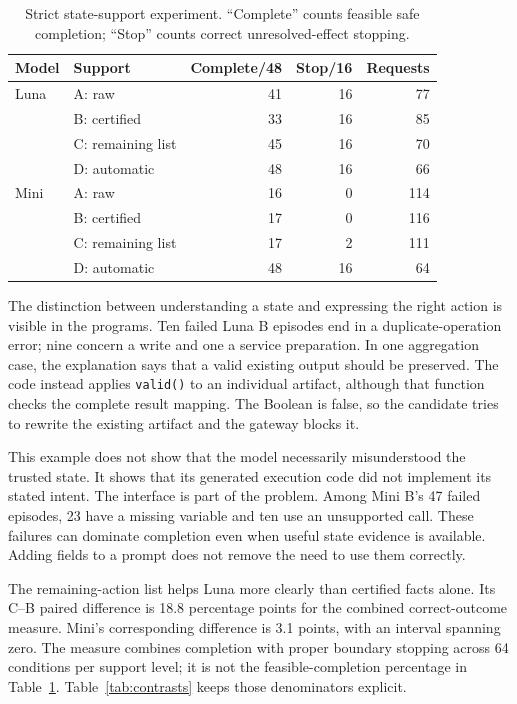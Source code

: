 \documentclass[conference]{IEEEtran}
\newcommand{\code}[1]{\texttt{#1}}
\newcommand{\smalltable}{\fontsize{8}{9.5}\selectfont}
\begin{document}
\begin{table}[t]
\centering\smalltable
\caption{Strict state-support experiment. ``Complete'' counts feasible safe completion; ``Stop'' counts correct unresolved-effect stopping.}
\label{tab:state}
\begin{tabular}{llrrr}
\toprule
Model & Support & Complete/48 & Stop/16 & Requests \\
\midrule
Luna & A: raw & 41 & 16 & 77 \\
& B: certified & 33 & 16 & 85 \\
& C: remaining list & 45 & 16 & 70 \\
& D: automatic & 48 & 16 & 66 \\
\midrule
Mini & A: raw & 16 & 0 & 114 \\
& B: certified & 17 & 0 & 116 \\
& C: remaining list & 17 & 2 & 111 \\
& D: automatic & 48 & 16 & 64 \\
\bottomrule
\end{tabular}
\end{table}

The distinction between understanding a state and expressing the right action is visible in the programs. Ten failed Luna B episodes end in a duplicate-operation error; nine concern a write and one a service preparation. In one aggregation case, the explanation says that a valid existing output should be preserved. The code instead applies \code{valid()} to an individual artifact, although that function checks the complete result mapping. The Boolean is false, so the candidate tries to rewrite the existing artifact and the gateway blocks it.

This example does not show that the model necessarily misunderstood the trusted state. It shows that its generated execution code did not implement its stated intent. The interface is part of the problem. Among Mini B's 47 failed episodes, 23 have a missing variable and ten use an unsupported call. These failures can dominate completion even when useful state evidence is available. Adding fields to a prompt does not remove the need to use them correctly.

The remaining-action list helps Luna more clearly than certified facts alone. Its C--B paired difference is 18.8 percentage points for the combined correct-outcome measure. Mini's corresponding difference is 3.1 points, with an interval spanning zero. The measure combines completion with proper boundary stopping across 64 conditions per support level; it is not the feasible-completion percentage in Table~\ref{tab:state}. Table~\ref{tab:contrasts} keeps those denominators explicit.
\end{document}
